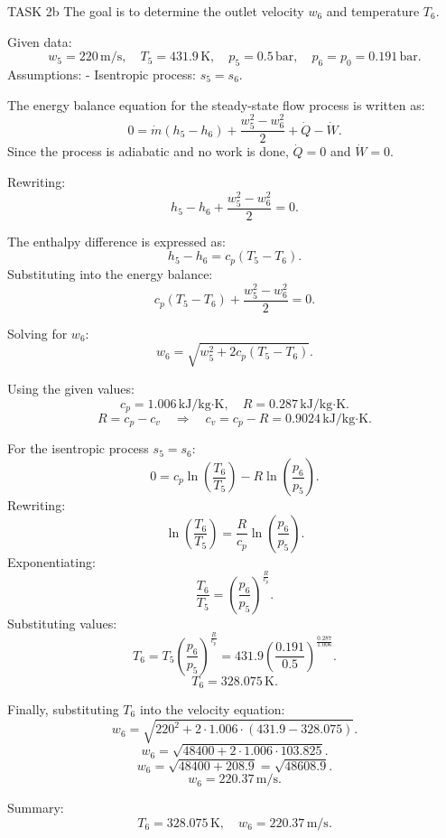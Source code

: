 TASK 2b  
The goal is to determine the outlet velocity \( w_6 \) and temperature \( T_6 \).  

Given data:  
\[
w_5 = 220 \, \text{m/s}, \quad T_5 = 431.9 \, \text{K}, \quad p_5 = 0.5 \, \text{bar}, \quad p_6 = p_0 = 0.191 \, \text{bar}.
\]  
Assumptions:  
- Isentropic process: \( s_5 = s_6 \).  

The energy balance equation for the steady-state flow process is written as:  
\[
0 = \dot{m} \left( h_5 - h_6 \right) + \frac{w_5^2 - w_6^2}{2} + \dot{Q} - \dot{W}.
\]  
Since the process is adiabatic and no work is done, \( \dot{Q} = 0 \) and \( \dot{W} = 0 \).  

Rewriting:  
\[
h_5 - h_6 + \frac{w_5^2 - w_6^2}{2} = 0.
\]  

The enthalpy difference is expressed as:  
\[
h_5 - h_6 = c_p \left( T_5 - T_6 \right).
\]  
Substituting into the energy balance:  
\[
c_p \left( T_5 - T_6 \right) + \frac{w_5^2 - w_6^2}{2} = 0.
\]  

Solving for \( w_6 \):  
\[
w_6 = \sqrt{w_5^2 + 2 c_p \left( T_5 - T_6 \right)}.
\]  

Using the given values:  
\[
c_p = 1.006 \, \text{kJ/kg·K}, \quad R = 0.287 \, \text{kJ/kg·K}.
\]  
\[
R = c_p - c_v \quad \Rightarrow \quad c_v = c_p - R = 0.9024 \, \text{kJ/kg·K}.
\]  

For the isentropic process \( s_5 = s_6 \):  
\[
0 = c_p \ln \left( \frac{T_6}{T_5} \right) - R \ln \left( \frac{p_6}{p_5} \right).
\]  
Rewriting:  
\[
\ln \left( \frac{T_6}{T_5} \right) = \frac{R}{c_p} \ln \left( \frac{p_6}{p_5} \right).
\]  
Exponentiating:  
\[
\frac{T_6}{T_5} = \left( \frac{p_6}{p_5} \right)^{\frac{R}{c_p}}.
\]  
Substituting values:  
\[
T_6 = T_5 \left( \frac{p_6}{p_5} \right)^{\frac{R}{c_p}} = 431.9 \left( \frac{0.191}{0.5} \right)^{\frac{0.287}{1.006}}.
\]  
\[
T_6 = 328.075 \, \text{K}.
\]  

Finally, substituting \( T_6 \) into the velocity equation:  
\[
w_6 = \sqrt{220^2 + 2 \cdot 1.006 \cdot (431.9 - 328.075)}.
\]  
\[
w_6 = \sqrt{48400 + 2 \cdot 1.006 \cdot 103.825}.
\]  
\[
w_6 = \sqrt{48400 + 208.9} = \sqrt{48608.9}.
\]  
\[
w_6 = 220.37 \, \text{m/s}.
\]  

Summary:  
\[
T_6 = 328.075 \, \text{K}, \quad w_6 = 220.37 \, \text{m/s}.
\]